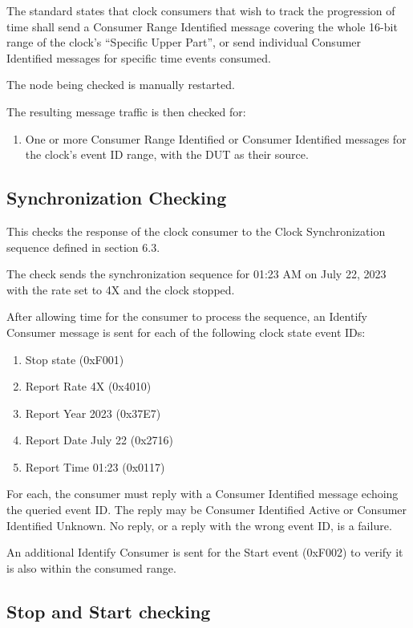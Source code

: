 The standard states that clock consumers that wish to track the progression of time
shall send a Consumer Range Identified message covering the whole 16-bit range of
the clock's ``Specific Upper Part'', or send individual Consumer Identified messages
for specific time events consumed.

The node being checked is manually restarted.

The resulting message traffic is then checked for:
\begin{enumerate}
\item One or more Consumer Range Identified or Consumer Identified messages
      for the clock's event ID range, with the DUT as their source.
\end{enumerate}

\subsection{Synchronization Checking}

This checks the response of the clock consumer to the Clock Synchronization sequence defined
in section 6.3.

The check sends the synchronization sequence for
    01:23 AM on July 22, 2023 with the rate set to 4X and the clock stopped.

After allowing time for the consumer to process the sequence, an Identify Consumer
message is sent for each of the following clock state event IDs:
\begin{enumerate}
\item Stop state (0xF001)
\item Report Rate 4X (0x4010)
\item Report Year 2023 (0x37E7)
\item Report Date July 22 (0x2716)
\item Report Time 01:23 (0x0117)
\end{enumerate}

For each, the consumer must reply with a Consumer Identified message echoing
the queried event ID.  The reply may be Consumer Identified Active or
Consumer Identified Unknown.  No reply, or a reply with the wrong event ID,
is a failure.

An additional Identify Consumer is sent for the Start event (0xF002) to verify
it is also within the consumed range.

\subsection{Stop and Start checking}

